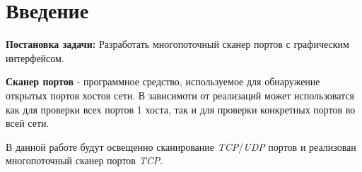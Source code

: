 \hypertarget{ux432ux432ux435ux434ux435ux43dux438ux435}{%
\section{Введение}\label{ux432ux432ux435ux434ux435ux43dux438ux435}}

\textbf{Постановка задачи:} Разработать многопоточный сканер портов с
графическим интерфейсом.

\textbf{Сканер портов} - программное средство, используемое для
обнаружение открытых портов хостов сети. В зависимоти от реализаций
может использоватся как для проверки всех портов 1 хоста, так и для
проверки конкретных портов во всей сети.

В данной работе будут освещенно сканирование \emph{TCP}/\emph{UDP}
портов и реализован многопоточный сканер портов \emph{TCP}.
